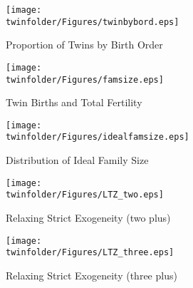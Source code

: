 \begin{figure}[htpb!]
\begin{center}
\caption{Proportion of Twins by Birth Order}
\label{TWINfig:bord}
\texttt{[image: \\twinfolder/Figures/twinbybord.eps]} 
\end{center}
\end{figure}

\begin{figure}[htpb!]
\begin{center}
\caption{Twin Births and Total Fertility}
\label{TWINfig:births}
\texttt{[image: \\twinfolder/Figures/famsize.eps]} 
\end{center}
\end{figure}

\begin{figure}[htpb!]
\begin{center}
\caption{Distribution of Ideal Family Size}
\label{TWINfig:ideal}
\texttt{[image: \\twinfolder/Figures/idealfamsize.eps]} 
\end{center}
\end{figure}

\begin{figure}[htpb!]
\begin{center}
\caption{Relaxing Strict Exogeneity (two plus)}
\label{TWINfig:ltz2}
\texttt{[image: \\twinfolder/Figures/LTZ\_two.eps]}
\vspace{-8mm}
\end{center}
\end{figure}

\begin{figure}[htpb!]
\begin{center}
\caption{Relaxing Strict Exogeneity (three plus)}
\label{TWINfig:ltz3}
\texttt{[image: \\twinfolder/Figures/LTZ\_three.eps]} 
\end{center}
\end{figure}



